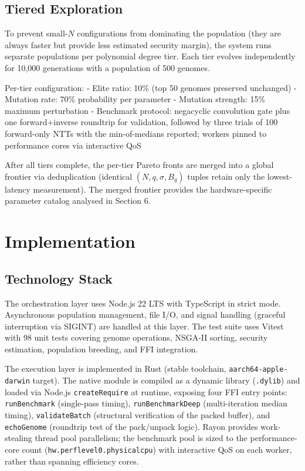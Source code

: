 \subsection{Tiered Exploration}\label{tiered-exploration}

To prevent small-\(N\) configurations from dominating the population (they are always faster but provide less estimated security margin), the system runs separate populations per polynomial degree tier. Each tier evolves independently for 10,000 generations with a population of 500 genomes.

Per-tier configuration:
- Elite ratio: 10\% (top 50 genomes preserved unchanged)
- Mutation rate: 70\% probability per parameter
- Mutation strength: 15\% maximum perturbation
- Benchmark protocol: negacyclic convolution gate plus one forward+inverse roundtrip for validation, followed by three trials of 100 forward-only NTTs with the min-of-medians reported; workers pinned to performance cores via interactive QoS

After all tiers complete, the per-tier Pareto fronts are merged into a global frontier via deduplication (identical \((N, q, \sigma, B_g)\) tuples retain only the lowest-latency measurement). The merged frontier provides the hardware-specific parameter catalog analysed in Section 6.

\section{Implementation}\label{implementation}

\subsection{Technology Stack}\label{technology-stack}

The orchestration layer uses Node.js 22 LTS with TypeScript in strict mode. Asynchronous population management, file I/O, and signal handling (graceful interruption via SIGINT) are handled at this layer. The test suite uses Vitest with 98 unit tests covering genome operations, NSGA-II sorting, security estimation, population breeding, and FFI integration.

The execution layer is implemented in Rust (stable toolchain, \texttt{aarch64-apple-darwin} target). The native module is compiled as a dynamic library (\texttt{.dylib}) and loaded via Node.js \texttt{createRequire} at runtime, exposing four FFI entry points: \texttt{runBenchmark} (single-pass timing), \texttt{runBenchmarkDeep} (multi-iteration median timing), \texttt{validateBatch} (structural verification of the packed buffer), and \texttt{echoGenome} (roundtrip test of the pack/unpack logic). Rayon provides work-stealing thread pool parallelism; the benchmark pool is sized to the performance-core count (\texttt{hw.perflevel0.physicalcpu}) with interactive QoS on each worker, rather than spanning efficiency cores.

